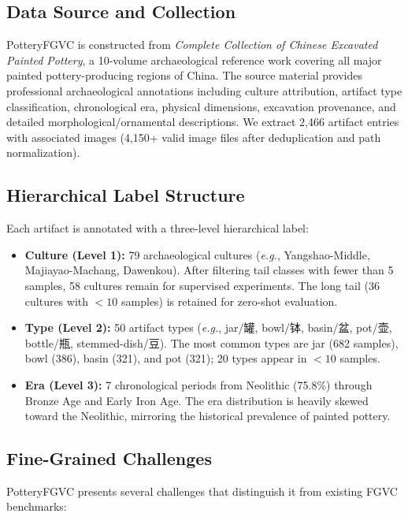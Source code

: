 \documentclass[10pt,twocolumn,letterpaper]{article}
\begin{document}
\subsection{Data Source and Collection}

PotteryFGVC is constructed from \emph{Complete Collection of Chinese Excavated Painted Pottery}, a 10-volume archaeological reference work covering all major painted pottery-producing regions of China. The source material provides professional archaeological annotations including culture attribution, artifact type classification, chronological era, physical dimensions, excavation provenance, and detailed morphological/ornamental descriptions. We extract 2,466 artifact entries with associated images (4,150+ valid image files after deduplication and path normalization).

\subsection{Hierarchical Label Structure}

Each artifact is annotated with a three-level hierarchical label:

\begin{itemize}
    \item \textbf{Culture (Level 1):} 79 archaeological cultures (\emph{e.g.}, Yangshao-Middle, Majiayao-Machang, Dawenkou). After filtering tail classes with fewer than 5 samples, 58 cultures remain for supervised experiments. The long tail (36 cultures with $<10$ samples) is retained for zero-shot evaluation.

    \item \textbf{Type (Level 2):} 50 artifact types (\emph{e.g.}, jar/罐, bowl/钵, basin/盆, pot/壶, bottle/瓶, stemmed-dish/豆). The most common types are jar (682 samples), bowl (386), basin (321), and pot (321); 20 types appear in $<10$ samples.

    \item \textbf{Era (Level 3):} 7 chronological periods from Neolithic (75.8\%) through Bronze Age and Early Iron Age. The era distribution is heavily skewed toward the Neolithic, mirroring the historical prevalence of painted pottery.
\end{itemize}

\subsection{Fine-Grained Challenges}

PotteryFGVC presents several challenges that distinguish it from existing FGVC benchmarks:
\end{document}
